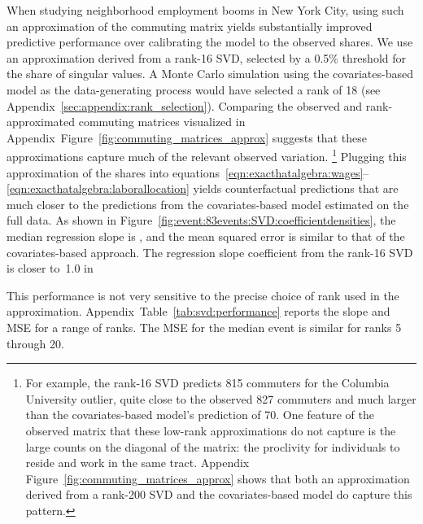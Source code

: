 \documentclass[11pt]{article}
\theoremstyle{definition}
\begin{document}
When studying neighborhood employment booms in New York City,
using such an approximation of the commuting matrix
yields substantially improved predictive performance 
over calibrating the model to the observed shares.
We use an approximation derived from a rank-16 SVD,
selected by a 0.5\% threshold for the share of singular values.
A Monte Carlo simulation using the covariates-based model as the data-generating process would have selected a rank of 18 (see Appendix~\ref{sec:appendix:rank_selection}).
Comparing the observed and rank-approximated commuting matrices
visualized in Appendix~Figure~\ref{fig:commuting_matrices_approx}
suggests that these approximations capture much of the relevant observed variation.%
\footnote{%
	For example, the rank-16 SVD predicts 815 commuters for the Columbia University outlier,
	quite close to the observed 827 commuters and much larger than the covariates-based model's prediction of 70.
	One feature of the observed matrix that these low-rank approximations do not capture
	is the large counts on the diagonal of the matrix:
	the proclivity for individuals to reside and work in the same tract.
	Appendix Figure~\ref{fig:commuting_matrices_approx} shows that
	both an approximation derived from a rank-200 SVD
	and
	the covariates-based model do capture this pattern.
}
Plugging this approximation of the shares into equations~\eqref{eqn:exacthatalgebra:wages}--\eqref{eqn:exacthatalgebra:laborallocation}
yields counterfactual predictions that are much closer to the predictions
from the covariates-based model estimated on the full data.
As shown in Figure~\ref{fig:event:83events:SVD:coefficientdensities},
the median regression slope is \unskip,
and
the mean squared error is similar to that of the covariates-based approach.
The regression slope coefficient from the rank-16 SVD is closer to~1.0 in

This performance is not very sensitive to the precise choice of rank used in the approximation.
Appendix~Table~\ref{tab:svd:performance} reports the slope and MSE for a range of ranks.
The MSE for the median event is similar for ranks 5 through 20.
\end{document}

